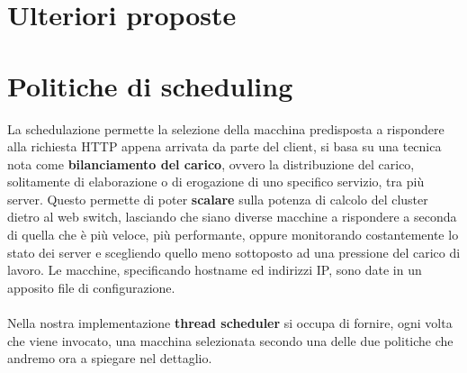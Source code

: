 \documentclass[italian]{tktltiki2}
\begin{document}
\section{Ulteriori proposte}

\newpage
\section{Politiche di scheduling}
 \label{sec: sched_p}
La schedulazione permette la selezione della macchina predisposta a rispondere alla richiesta HTTP appena arrivata da parte del client, si basa su una tecnica nota come \textbf{bilanciamento del carico}, ovvero la distribuzione del carico, solitamente di elaborazione o di erogazione di uno specifico servizio, tra più server. Questo permette di poter \textbf{scalare} sulla potenza di calcolo del cluster dietro al web switch, lasciando che siano diverse macchine a rispondere a seconda di quella che è più veloce, più performante, oppure monitorando costantemente lo stato dei server e scegliendo quello meno sottoposto ad una pressione del carico di lavoro. Le macchine, specificando hostname ed indirizzi IP, sono date in un apposito file di configurazione.
\\
\\ 
Nella nostra implementazione \textbf{thread scheduler} si occupa di fornire,  ogni volta che viene invocato, una macchina selezionata secondo una delle due politiche che andremo ora a spiegare nel dettaglio.
\end{document}
